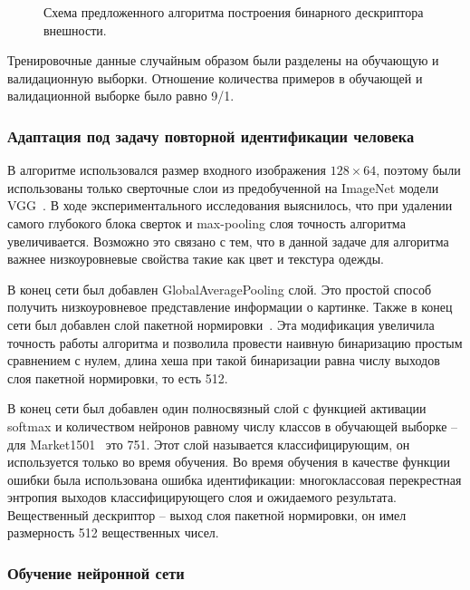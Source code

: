 \documentclass[a4paper,twoside,11pt]{article}
\numberwithin{equation}{section}
\begin{document}
\begin{figure}[t]
    \caption{Схема предложенного алгоритма построения бинарного дескриптора внешности.}
    \label{architecture}
\end{figure}

Тренировочные данные случайным образом были разделены на обучающую и валидационную выборки. Отношение количества примеров в обучающей и валидационной выборке было равно 9/1.

\subsubsection{Адаптация под задачу повторной идентификации человека}

В алгоритме использовался размер входного изображения $128 \times 64$, поэтому были использованы только сверточные слои из предобученной на ImageNet модели VGG~\cite{simonyan2014very}. В ходе экспериментального исследования выяснилось, что при удалении самого глубокого блока сверток и max-pooling слоя точность алгоритма увеличивается. Возможно это связано с тем, что в данной задаче для алгоритма важнее низкоуровневые свойства такие как цвет и текстура одежды.

В конец сети был добавлен GlobalAveragePooling слой. Это простой способ получить низкоуровневое представление информации о картинке. Также в конец сети был добавлен слой пакетной нормировки~\cite{ioffe2015batch}. Эта модификация увеличила точность работы алгоритма и позволила провести наивную бинаризацию простым сравнением с нулем, длина хеша при такой бинаризации равна числу выходов слоя пакетной нормировки, то есть 512.

В конец сети был добавлен один полносвязный слой с функцией активации softmax и количеством нейронов равному числу классов в обучающей выборке -- для Market1501~\cite{zheng2015scalable} это 751. Этот слой называется классифицирующим, он используется только во время обучения. Во время обучения в качестве функции ошибки была использована ошибка идентификации: многоклассовая перекрестная энтропия выходов классифицирующего слоя и ожидаемого результата. Вещественный дескриптор -- выход слоя пакетной нормировки, он имел размерность 512 вещественных чисел.

\subsubsection{Обучение нейронной сети}
\end{document}
